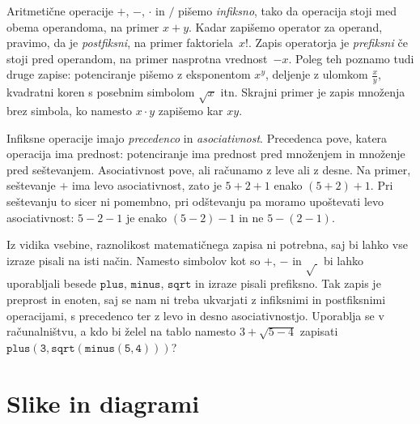 Aritmetične operacije $+$, $-$, $\cdot$ in $/$ pišemo \emph{infiksno}, tako da operacija
stoji med obema operandoma, na primer $x + y$. Kadar zapišemo operator za operand,
pravimo, da je \emph{postfiksni}, na primer faktoriela~$x!$. Zapis operatorja je
\emph{prefiksni} če stoji pred operandom, na primer nasprotna vrednost~$-x$. Poleg teh
poznamo tudi druge zapise: potenciranje pišemo z eksponentom $x^y$, deljenje z ulomkom
$\frac{x}{y}$, kvadratni koren s posebnim simbolom $\sqrt{x}$ itn. Skrajni primer je zapis
množenja brez simbola, ko namesto $x \cdot y$ zapišemo kar $x y$.

Infiksne operacije imajo \emph{precedenco} in \emph{asociativnost}. Precedenca pove,
katera operacija ima prednost: potenciranje ima prednost pred množenjem in množenje pred
seštevanjem. Asociativnost pove, ali računamo z leve ali z desne. Na primer, seštevanje
$+$ ima levo asociativnost, zato je $5 + 2 + 1$ enako $(5 + 2) + 1$. Pri seštevanju to
sicer ni pomembno, pri odštevanju pa moramo upoštevati levo asociativnost: $5 - 2 - 1$ je
enako $(5 - 2) - 1$ in ne $5 - (2 - 1)$. 

Iz vidika vsebine, raznolikost matematičnega zapisa ni potrebna, saj bi lahko vse izraze
pisali na isti način. Namesto simbolov kot so $+$, $-$ in $\sqrt{\ }$ bi lahko uporabljali
besede $\mathtt{plus}$, $\mathtt{minus}$, $\mathtt{sqrt}$ in izraze pisali prefiksno. Tak
zapis je preprost in enoten, saj se nam ni treba ukvarjati z infiksnimi in postfiksnimi
operacijami, s precedenco ter z levo in desno asociativnostjo. Uporablja se v
računalništvu, a kdo bi želel na tablo namesto $3 + \sqrt{5 - 4}$ zapisati
$\mathtt{plus(3, \mathtt{sqrt}(\mathtt{minus}(5, 4)))}$?




\section{Slike in diagrami}
\label{sec:slike-in-diagrami}







